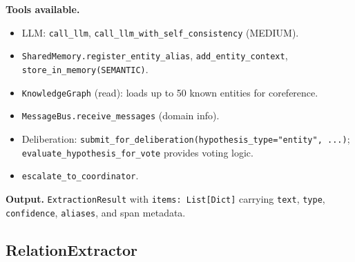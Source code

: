 \documentclass{article}
\begin{document}
\begin{agentbox}
\textbf{Tools available.}
\begin{itemize}[leftmargin=*,nosep]
\item LLM: \texttt{call\_llm}, \texttt{call\_llm\_with\_self\_consistency} (MEDIUM).
\item \texttt{SharedMemory.register\_entity\_alias}, \texttt{add\_entity\_context}, \texttt{store\_in\_memory(SEMANTIC)}.
\item \texttt{KnowledgeGraph} (read): loads up to 50 known entities for coreference.
\item \texttt{MessageBus.receive\_messages} (domain info).
\item Deliberation: \texttt{submit\_for\_deliberation(hypothesis\_type="entity", ...)}; \texttt{evaluate\_hypothesis\_for\_vote} provides voting logic.
\item \texttt{escalate\_to\_coordinator}.
\end{itemize}

\textbf{Output.} \texttt{ExtractionResult} with \texttt{items: List[Dict]} carrying \texttt{text}, \texttt{type}, \texttt{confidence}, \texttt{aliases}, and span metadata.
\end{agentbox}

\newpage
\subsection{RelationExtractor}
\label{app:relation_extractor}
\end{document}
